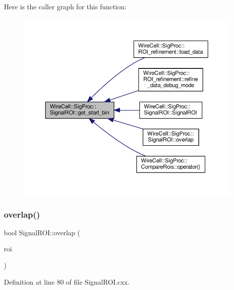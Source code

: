 Here is the caller graph for this function\+:
\nopagebreak
\begin{figure}[H]
\begin{center}
\leavevmode
\includegraphics[width=350pt]{class_wire_cell_1_1_sig_proc_1_1_signal_r_o_i_acfe33b6d693694e95f905a34a2940c32_icgraph}
\end{center}
\end{figure}
\mbox{\label{class_wire_cell_1_1_sig_proc_1_1_signal_r_o_i_a2b79f88f3551f06ccb3f61aaa00da118}} 
\subsubsection{\texorpdfstring{overlap()}{overlap()}\hspace{0.1cm}{\footnotesize\ttfamily [1/2]}}
{\footnotesize\ttfamily bool Signal\+R\+O\+I\+::overlap (\begin{DoxyParamCaption}\item[{\hyperlink{class_wire_cell_1_1_sig_proc_1_1_signal_r_o_i}{Signal\+R\+OI} $\ast$}]{roi }\end{DoxyParamCaption})}



Definition at line 80 of file Signal\+R\+O\+I.\+cxx.

